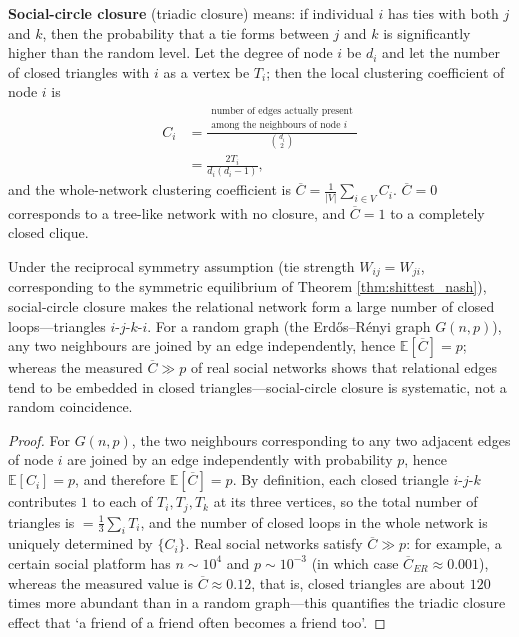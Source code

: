 \begin{definition}\label{ch27_triadic_closure}
\textbf{Social-circle closure} (triadic closure) means: if individual $i$ has ties with both $j$ and $k$, then the probability that a tie forms between $j$ and $k$ is significantly higher than the random level. Let the degree of node $i$ be $d_i$ and let the number of closed triangles with $i$ as a vertex be $T_i$; then the local clustering coefficient of node $i$ is
\[
\begin{aligned}
C_i
&= \frac{\begin{gathered}\text{number of edges actually present}\\\text{among the neighbours of node }i\end{gathered}}{\binom{d_i}{2}}\\
&= \frac{2T_i}{d_i(d_i-1)},
\end{aligned}
\]
and the whole-network clustering coefficient is $\overline{C} = \frac{1}{|V|}\sum_{i\in V} C_i$. $\overline{C}=0$ corresponds to a tree-like network with no closure, and $\overline{C}=1$ to a completely closed clique.
\end{definition}

\begin{proposition}\label{ch27_closure_loop}
Under the reciprocal symmetry assumption (tie strength $W_{ij}=W_{ji}$, corresponding to the symmetric equilibrium of Theorem \ref{thm:shittest_nash}), social-circle closure makes the relational network form a large number of closed loops---triangles $i$-$j$-$k$-$i$. For a random graph (the Erdős--Rényi graph $G(n,p)$), any two neighbours are joined by an edge independently, hence $\mathbb{E}[\overline{C}] = p$; whereas the measured $\overline{C} \gg p$ of real social networks shows that relational edges tend to be embedded in closed triangles---social-circle closure is systematic, not a random coincidence.
\end{proposition}

\begin{proof}
For $G(n,p)$, the two neighbours corresponding to any two adjacent edges of node $i$ are joined by an edge independently with probability $p$, hence $\mathbb{E}[C_i] = p$, and therefore $\mathbb{E}[\overline{C}] = p$. By definition, each closed triangle $i$-$j$-$k$ contributes $1$ to each of $T_i, T_j, T_k$ at its three vertices, so the total number of triangles is $= \frac{1}{3}\sum_i T_i$, and the number of closed loops in the whole network is uniquely determined by $\{C_i\}$. Real social networks satisfy $\overline{C} \gg p$: for example, a certain social platform has $n \sim 10^4$ and $p \sim 10^{-3}$ (in which case $\overline{C}_{ER}\approx 0.001$), whereas the measured value is $\overline{C}\approx 0.12$, that is, closed triangles are about $120$ times more abundant than in a random graph---this quantifies the triadic closure effect that `a friend of a friend often becomes a friend too'.
\end{proof}

